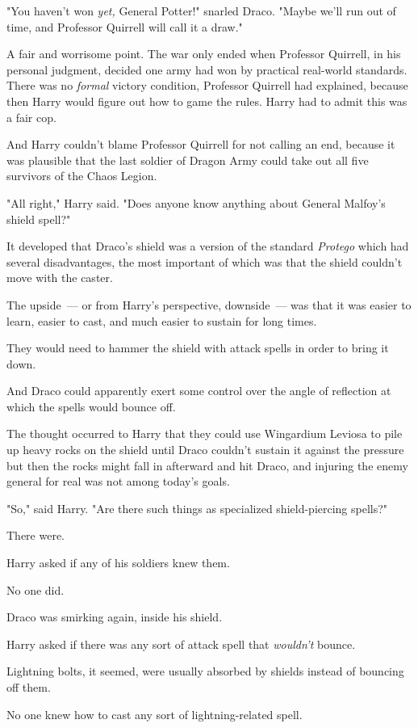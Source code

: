 "You haven't won \emph{yet,} General Potter!" snarled Draco. "Maybe we'll run
out of time, and Professor Quirrell will call it a draw."

A fair and worrisome point. The war only ended when Professor Quirrell, in his
personal judgment, decided one army had won by practical real-world standards.
There was no \emph{formal} victory condition, Professor Quirrell had explained,
because then Harry would figure out how to game the rules. Harry had to admit
this was a fair cop.

And Harry couldn't blame Professor Quirrell for not calling an end, because it
was plausible that the last soldier of Dragon Army could take out all five
survivors of the Chaos Legion.

"All right," Harry said. "Does anyone know anything about General Malfoy's
shield spell?"

It developed that Draco's shield was a version of the standard \emph{Protego}
which had several disadvantages, the most important of which was that the
shield couldn't move with the caster.

The upside~--- or from Harry's perspective, downside~--- was that it was easier to
learn, easier to cast, and much easier to sustain for long times.

They would need to hammer the shield with attack spells in order to bring it
down.

And Draco could apparently exert some control over the angle of reflection at
which the spells would bounce off.

The thought occurred to Harry that they could use Wingardium Leviosa to pile up
heavy rocks on the shield until Draco couldn't sustain it against the
pressure{\el} but then the rocks might fall in afterward and hit Draco, and
injuring the enemy general for real was not among today's goals.

"So," said Harry. "Are there such things as specialized shield-piercing spells?"

There were.

Harry asked if any of his soldiers knew them.

No one did.

Draco was smirking again, inside his shield.

Harry asked if there was any sort of attack spell that \emph{wouldn't} bounce.

Lightning bolts, it seemed, were usually absorbed by shields instead of
bouncing off them.

{\el} No one knew how to cast any sort of lightning-related spell.


